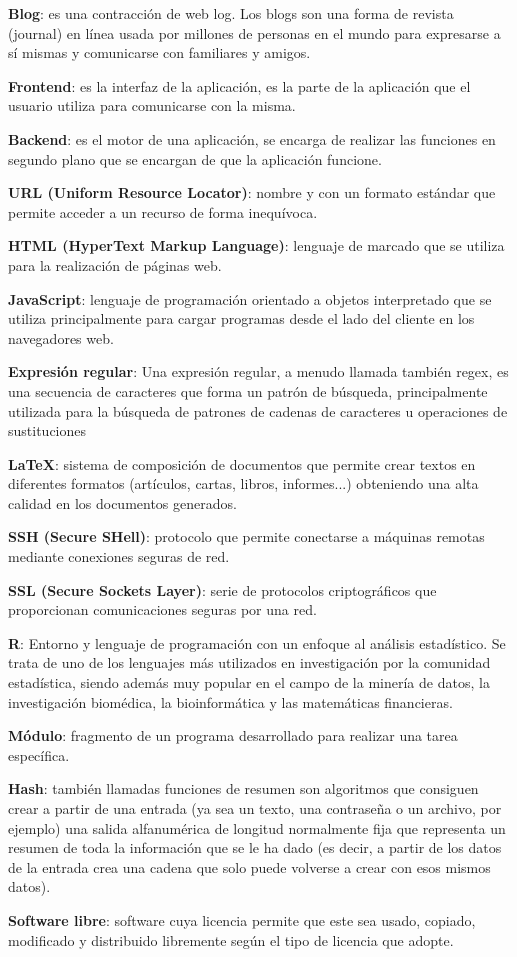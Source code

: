 \textbf{Blog}: es una contracción de web log. Los blogs son una forma de revista (journal) en línea usada por millones de personas en el mundo para expresarse a sí mismas y comunicarse con familiares y amigos.
\bigskip


\textbf{Frontend}: es la interfaz de la aplicación, es la parte de la aplicación que el usuario utiliza para comunicarse con la misma.
\bigskip

\textbf{Backend}: es el motor de una aplicación, se encarga de realizar las funciones en segundo plano que se encargan de que la aplicación funcione.
\bigskip

\textbf{URL (Uniform Resource Locator)}: nombre y con un formato estándar que permite acceder a un recurso de forma inequívoca.
\bigskip

\textbf{HTML (HyperText Markup Language)}: lenguaje de marcado que se utiliza para la realización de páginas web.
\bigskip

\textbf{JavaScript}: lenguaje de programación orientado a objetos interpretado que se utiliza principalmente para cargar programas desde el lado del cliente en los navegadores web.
\bigskip

\textbf{Expresión regular}: Una expresión regular, a menudo llamada también regex, es una secuencia de caracteres que forma un patrón de búsqueda, principalmente utilizada para la búsqueda de patrones de cadenas de caracteres u operaciones de sustituciones
\bigskip

\textbf{LaTeX}: sistema de composición de documentos que permite crear textos en diferentes formatos (artículos, cartas, libros, informes...) obteniendo una alta calidad en los documentos generados.
\bigskip

\textbf{SSH (Secure SHell)}: protocolo que permite conectarse a máquinas remotas mediante conexiones seguras de red.
\bigskip

\textbf{SSL (Secure Sockets Layer)}: serie de protocolos criptográficos que proporcionan comunicaciones seguras por una red.
\bigskip

\textbf{R}: Entorno y lenguaje de programación con un enfoque al análisis estadístico. Se trata de uno de los lenguajes más utilizados en investigación por la comunidad estadística, siendo además muy popular en el campo de la minería de datos, la investigación biomédica, la bioinformática y las matemáticas financieras.
\bigskip

\textbf{Módulo}: fragmento de un programa desarrollado para realizar una tarea específica.
\bigskip

\textbf{Hash}: también llamadas funciones de resumen son algoritmos que consiguen crear a partir de una entrada (ya sea un texto, una contraseña o un archivo, por ejemplo) una salida alfanumérica de longitud normalmente fija que representa un resumen de toda la información que se le ha dado (es decir, a partir de los datos de la entrada crea una cadena que solo puede volverse a crear con esos mismos datos).
\bigskip

\textbf{Software libre}: software cuya licencia permite que este sea usado, copiado, modificado y distribuido libremente según el tipo de licencia que adopte.
\bigskip
